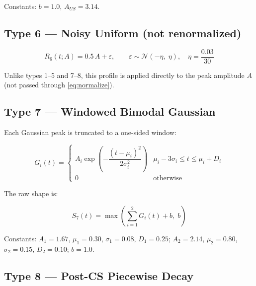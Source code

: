 \documentclass{article}
\begin{document}
\noindent
Constants: $b = 1.0$, $A_{US} = 3.14$.

\subsection*{Type 6 --- Noisy Uniform (not renormalized)}

\begin{equation}\label{eq:type6}
    R_6(t; A) = 0.5\,A+\varepsilon, \qquad \varepsilon \sim \mathcal{N}\!\left(-\eta,\; \eta\right), \quad \eta = \frac{0.03}{30}
\end{equation}

\noindent
Unlike types 1--5 and 7--8, this profile is applied directly to the peak amplitude
$A$ (not passed through \eqref{eq:normalize}).

\subsection*{Type 7 --- Windowed Bimodal Gaussian}

Each Gaussian peak is truncated to a one-sided window:

\begin{equation}
    G_i(t) = \begin{cases}
        A_i \exp\!\left(-\dfrac{(t - \mu_i)^2}{2\sigma_i^2}\right) & \mu_i - 3\sigma_i \leq t \leq \mu_i + D_i \\[6pt]
        0 & \text{otherwise}
    \end{cases}
\end{equation}

The raw shape is:

\begin{equation}\label{eq:type7}
    S_7(t) = \max\!\left(\sum_{i=1}^{2} G_i(t) + b,\; b\right)
\end{equation}

\noindent
Constants: $A_1 = 1.67$, $\mu_1 = 0.30$, $\sigma_1 = 0.08$, $D_1 = 0.25$;
$A_2 = 2.14$, $\mu_2 = 0.80$, $\sigma_2 = 0.15$, $D_2 = 0.10$; $b = 1.0$.

\subsection*{Type 8 --- Post-CS Piecewise Decay}
\end{document}
